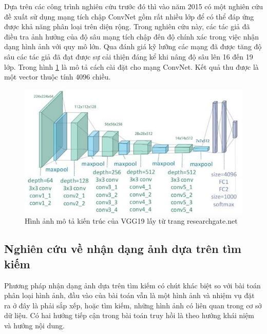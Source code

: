 \documentclass[12pt]{report}
\begin{document}
		Dựa trên các công trình nghiên cứu trước đó thì vào năm 2015 có một nghiên cứu \cite{cia_vgg19} đề xuất sử dụng mạng tích chập ConvNet \cite{cia_vgg19} gồm rất nhiều lớp để có thể đáp ứng được khả năng phân loại trên diện rộng. Trong nghiên cứu này, các tác giả đã điều tra ảnh hưởng của độ sâu mạng tích chập đến độ chính xác trong việc nhận dạng hình ảnh với quy mô lớn.												
		Qua đánh giá kỹ lưỡng các mạng đã được tăng độ sâu các tác giả đã đạt được sự cải thiện đáng kể khi nâng độ sâu lên 16 đến 19 lớp.
		Trong hình \ref{fig:vgg19_image} là mô tả cách cài đặt cho mạng ConvNet. Kết quả thu được là một vector thuộc tính 4096 chiều.
				\begin{figure}[h]
			\centering
			\includegraphics[scale=0.7]{vgg19_image}
			\caption{Hình ảnh mô tả kiến trúc của VGG19 \cite{cia_vgg19} lấy từ trang researchgate.net}
			\label{fig:vgg19_image}
		\end{figure}				\newpage
																								
		
																										
		\subsection{Nghiên cứu về nhận dạng ảnh dựa trên tìm kiếm}
																										
		Phương pháp nhận dạng ảnh dựa trên tìm kiếm \cite{image_retrival} có chút khác biệt so với bài toán phân loại hình ảnh, đầu vào của bài toán vẫn là một hình ảnh và nhiệm vụ đặt ra ở đây là phải sắp xếp, hoặc tìm kiếm, những hình ảnh có liên quan trong cơ sở dữ liệu. Có hai hướng tiếp cận trong bài toán truy hồi là theo hướng khái niệm và hướng nội dung.
																								
\end{document}
